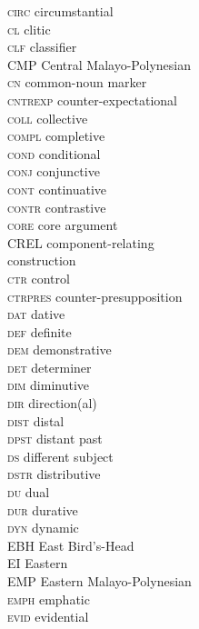 \begin{multicols}{2}
\begin{tabbing}
 \textsc{circ}  \> circumstantial \\
 \textsc{cl}  \> clitic \\
 \textsc{clf}  \> classifier \\
 \textsc{CMP}  \> Central Malayo-Polynesian \\
 \textsc{cn}  \> common-noun marker \\
 \textsc{cntrexp}  \> counter-expectational \\
 \textsc{coll}  \> collective \\
 \textsc{compl}  \> completive \\
 \textsc{cond}  \> conditional \\
 \textsc{conj}  \> conjunctive \\
 \textsc{cont}  \> continuative \\
 \textsc{contr}  \> contrastive \\
 \textsc{core}  \> core argument \\
 \textsc{CREL}  \> component-relating \\\> construction \\
 \textsc{ctr}  \> control \\
 \textsc{ctrpres}  \> counter-presupposition \\
 \textsc{dat}  \> dative \\
 \textsc{def}  \> definite \\
 \textsc{dem}  \> demonstrative \\
 \textsc{det}  \> determiner \\
 \textsc{dim}  \> diminutive \\
 \textsc{dir}  \> direction(al) \\
 \textsc{dist}  \> distal \\
 \textsc{dpst}  \> distant past \\
 \textsc{ds}  \> different subject \\
 \textsc{dstr}  \> distributive \\
 \textsc{du}  \> dual \\
 \textsc{dur}  \> durative \\
 \textsc{dyn}  \> dynamic \\
 \textsc{EBH}  \> East Bird's-Head \\
 \textsc{EI}  \> Eastern  \\
 \textsc{EMP}  \> Eastern Malayo-Polynesian \\
 \textsc{emph}  \> emphatic \\
 \textsc{evid}  \> evidential \\

\end{tabbing}
\end{multicols}

